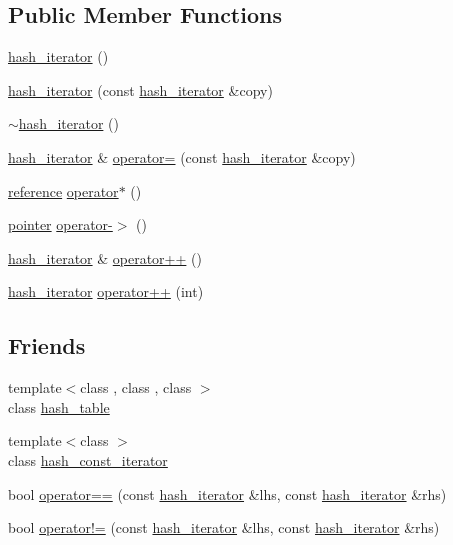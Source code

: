 \subsection*{Public Member Functions}
\begin{DoxyCompactItemize}
\item 
\hyperlink{classhash__iterator_ad0f7235a73c26d87f377e0263e597fd5}{hash\+\_\+iterator} ()
\item 
\hyperlink{classhash__iterator_ae7fa00c1d11ed898074461d91fd6f0c8}{hash\+\_\+iterator} (const \hyperlink{classhash__iterator}{hash\+\_\+iterator} \&copy)
\item 
\hyperlink{classhash__iterator_a9bdd951d9dfabdb244c5abcdd2e34255}{$\sim$hash\+\_\+iterator} ()
\item 
\hyperlink{classhash__iterator}{hash\+\_\+iterator} \& \hyperlink{classhash__iterator_a8915109ae1efcefb8fd9d23ccdafcf11}{operator=} (const \hyperlink{classhash__iterator}{hash\+\_\+iterator} \&copy)
\item 
\hyperlink{classhash__iterator_aaa355159b91ef00385b0c4256e9a9eaf}{reference} \hyperlink{classhash__iterator_a36d9980c71a1da8e85c225ffe5c6ee19}{operator$\ast$} ()
\item 
\hyperlink{classhash__iterator_a7e43a9eb7cc16f1e13c47e3b76762bb7}{pointer} \hyperlink{classhash__iterator_ad3099e64ec3d4c9627c2203b0cc6cdc1}{operator-\/$>$} ()
\item 
\hyperlink{classhash__iterator}{hash\+\_\+iterator} \& \hyperlink{classhash__iterator_a2ba5444dbf9ee440994fa4f2266512f2}{operator++} ()
\item 
\hyperlink{classhash__iterator}{hash\+\_\+iterator} \hyperlink{classhash__iterator_ac4ad4e8f01e526a6ccef90764224a09a}{operator++} (int)
\end{DoxyCompactItemize}
\subsection*{Friends}
\begin{DoxyCompactItemize}
\item 
{\footnotesize template$<$class , class , class $>$ }\\class \hyperlink{classhash__iterator_a39f140c37d8ec7b0c08b23083c94562e}{hash\+\_\+table}
\item 
{\footnotesize template$<$class $>$ }\\class \hyperlink{classhash__iterator_ab1e3d7f01b4a220194ffa3e42ab260dd}{hash\+\_\+const\+\_\+iterator}
\item 
bool \hyperlink{classhash__iterator_a1333d4e2a00e08b19d4efb85faabfb1d}{operator==} (const \hyperlink{classhash__iterator}{hash\+\_\+iterator} \&lhs, const \hyperlink{classhash__iterator}{hash\+\_\+iterator} \&rhs)
\item 
bool \hyperlink{classhash__iterator_a309d75f119087716a5713beaa07fe247}{operator!=} (const \hyperlink{classhash__iterator}{hash\+\_\+iterator} \&lhs, const \hyperlink{classhash__iterator}{hash\+\_\+iterator} \&rhs)
\end{DoxyCompactItemize}


